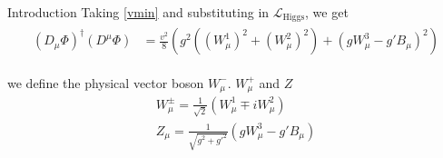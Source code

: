 \begin{chapter}{Introduction}
Taking \ref{vmin} and substituting in $\mathcal{L}_\text{Higgs}$, we get 
\begin{align}\label{W}
\begin{split}
(D_\mu \Phi)^\dagger (D^\mu \Phi)& =\frac{v^2}{8} \left(g^2 ((W^1_\mu)^2 +(W^2_\mu)^2 )+( gW^3_\mu -g'B_\mu)^2 \right)
\end{split}
\end{align}

we define the physical vector boson $W^-_\mu$. $W^+_\mu$ and $Z$ 
\begin{align} 
W^{\pm}_\mu=\frac{1}{\sqrt{2}} (W^1_\mu \mp iW^2_\mu) \label{smo}\\ 
Z_\mu=\frac{1}{\sqrt{g^2+g'^2}}\left(gW^3_\mu -g'B_\mu  \right) \label{zboson}
\end{align}



\end{chapter}
